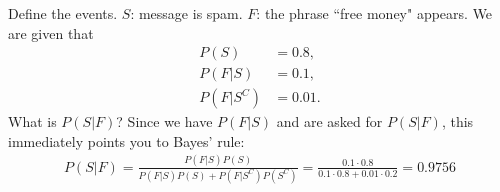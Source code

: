 

\setcounter{theorem}{0}

\begin{exercise} [BH2.1]
\begin{solution}
	Define the events. $S$: message is spam. $F$: the phrase ``free money" appears. We are given that
	\begin{align*}
		P(S) &= 0.8,\\
		P(F|S) & = 0.1,\\
		P(F|S^{C}) & = 0.01.
	\end{align*}
	What is $P(S|F)$? Since we have $P(F|S)$ and are asked for $P(S|F)$, this immediately points you to Bayes' rule:
	\begin{align*}
		P(S|F) = \frac{P(F|S)P(S)}{P(F|S)P(S)+P(F|S^{C})P(S^{C})} = \frac{0.1\cdot 0.8}{0.1\cdot 0.8 + 0.01\cdot 0.2} = 0.9756
	\end{align*}
\end{solution}
\end{exercise}


